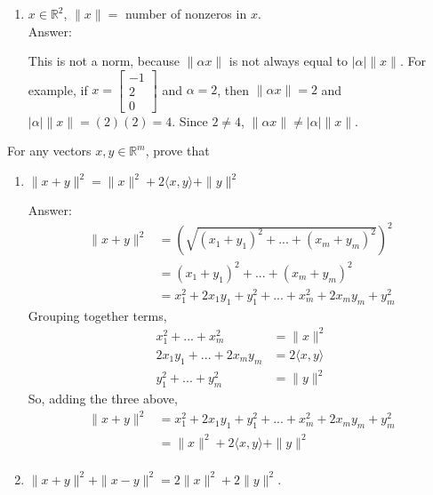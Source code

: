 \documentclass[11pt]{amsart}
\begin{document}
{\begin{enumerate}
{\begin{enumerate}
\item $x \in \mathbb{R}^2$, $\|x\| = $ number of nonzeros in $x$. \\
Answer: 

This is not a norm, because $\|\alpha x\|$ is not always equal to $|\alpha|\|x\|$. For example, if $x = \begin{bmatrix} -1 \\ 2\\ 0\end{bmatrix}$ and $\alpha = 2$, then $\|\alpha x\| = 2$ and $|\alpha|\|x\| = (2)(2) = 4$. Since $2 \neq 4$, $\|\alpha x\| \neq |\alpha|\|x\|$.

\bigskip 

\end{enumerate}

\item[Problem 8:] For any vectors $x,y \in \mathbb{R}^m$, prove that 
\begin{enumerate}
\item $\|x+y\|^2 = \|x\|^2 + 2\langle x, y \rangle + \|y\|^2$

Answer: 
\begin{align} \nonumber
\|x+y\|^2 &= (\sqrt{(x_1 + y_1)^2 + ... + (x_m + y_m)^2})^2 \\ \nonumber
              &= (x_1 + y_1)^2 + ... + (x_m + y_m)^2 \\ \nonumber
              &= x_1^2 + 2x_1y_1 + y_1^2 + ... + x_m^2 + 2x_my_m + y_m^2
\end{align}
Grouping together terms,
\begin{align} \nonumber
x_1^2 + ... + x_m^2 &= \|x\|^2 \\ \nonumber
2x_1y_1 + ... + 2x_my_m &= 2\langle x, y \rangle \\ \nonumber
y_1^2 + ... + y_m^2 &= \|y\|^2 
\end{align} 
So, adding the three above, 
\begin{align} \nonumber
\|x+y\|^2 &= x_1^2 + 2x_1y_1 + y_1^2 + ... + x_m^2 + 2x_my_m + y_m^2 \\ \nonumber
              &= \|x\|^2 + 2\langle x, y \rangle + \|y\|^2 \\ \nonumber
\end{align}

\item $\|x + y\|^2 + \|x-y\|^2 = 2\|x\|^2 + 2\|y\|^2$.


\end{enumerate}}
\end{enumerate}}
\end{document}
